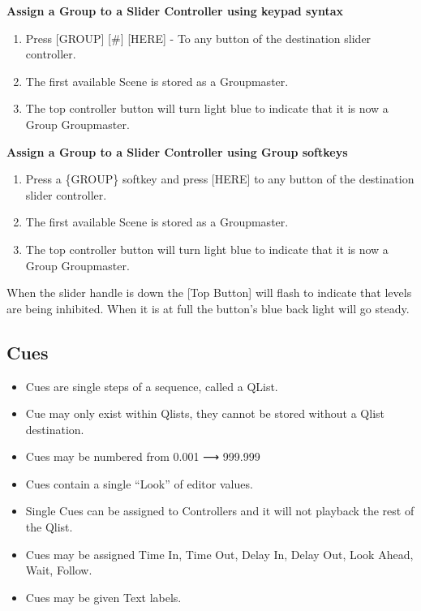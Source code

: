 \documentclass[
]{article}
\begin{document}
\textbf{Assign a Group to a Slider Controller using keypad syntax}

\begin{enumerate}
\def\labelenumi{\arabic{enumi}.}
\item
  Press {[}GROUP{]} {[}\#{]} {[}HERE{]} - To any button of the destination slider controller.
\item
  The first available Scene is stored as a Groupmaster.
\item
  The top controller button will turn light blue to indicate that it is now a Group Groupmaster.
\end{enumerate}

\textbf{Assign a Group to a Slider Controller using Group softkeys}

\begin{enumerate}
\def\labelenumi{\arabic{enumi}.}
\item
  Press a \{GROUP\} softkey and press {[}HERE{]} to any button of the destination slider controller.
\item
  The first available Scene is stored as a Groupmaster.
\item
  The top controller button will turn light blue to indicate that it is now a Group Groupmaster.
\end{enumerate}

{When the slider handle is down the {[}Top Button{]} will flash to indicate that levels are being inhibited. When it is at full the button's blue back light will go steady.}

\hypertarget{Cues-10.4}{%
\subsection{Cues}\label{Cues-10.4}}

\begin{itemize}
\item
  Cues are single steps of a sequence, called a QList.
\item
  Cue may only exist within Qlists, they cannot be stored without a Qlist destination.
\item
  Cues may be numbered from 0.001 ⟶ 999.999
\item
  Cues contain a single ``Look'' of editor values.
\item
  Single Cues can be assigned to Controllers and it will not playback the rest of the Qlist.
\item
  Cues may be assigned Time In, Time Out, Delay In, Delay Out, Look Ahead, Wait, Follow.
\item
  Cues may be given Text labels.
\end{itemize}
\end{document}
